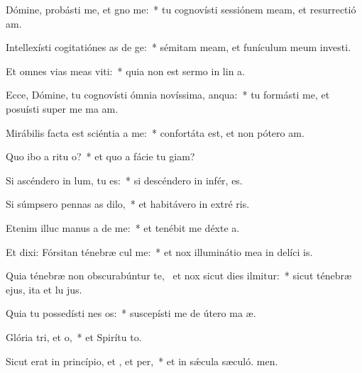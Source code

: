 \item Dómine, probásti me, et gno me:~* tu cognovísti sessiónem meam, et resurrectió am.
\item Intellexísti cogitatiónes as de ge:~* sémitam meam, et funículum meum investi.
\item Et omnes vias meas viti:~* quia non est sermo in lin a.
\item Ecce, Dómine, tu cognovísti ómnia novíssima,  anqua:~* tu formásti me, et posuísti super me ma am.
\item Mirábilis facta est sciéntia a  me:~* confortáta est, et non pótero  am.
\item Quo ibo a ritu o?~* et quo a fácie tu giam?
\item Si ascéndero in lum, tu  es:~* si descéndero in infér, es.
\item Si súmpsero pennas as dilo,~* et habitávero in extré ris.
\item Etenim illuc manus a de me:~* et tenébit me déxte a.
\item Et dixi: Fórsitan ténebræ cul me:~* et nox illuminátio mea in delíci is.
\item Quia ténebræ non obscurabúntur  te,~\pscross{} et nox sicut dies ilmitur:~* sicut ténebræ ejus, ita et lu jus.
\item Quia tu possedísti nes os:~* suscepísti me de útero ma æ.
\item Glória tri, et o,~* et Spirítu to.
\item Sicut erat in princípio, et , et per,~* et in sǽcula sæculó. men.
